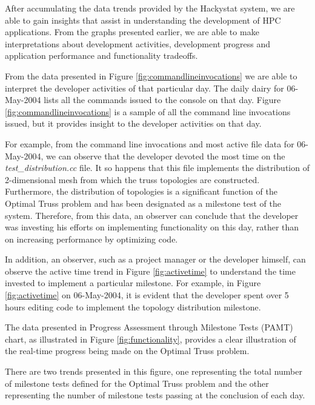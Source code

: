 \documentclass[10pt,twocolumn]{article}
\begin{document}
\label{sec:conclusions}

After accumulating the data trends provided by the Hackystat system,
we are able to gain insights that assist in understanding the
development of HPC applications.  From the graphs presented earlier,
we are able to make interpretations about development activities,
development progress and application performance and functionality
tradeoffs.

\label{sec:devactivities}

From the data presented in Figure \ref{fig:commandlineinvocations} we
are able to interpret the developer activities of that particular day.
The daily dairy for 06-May-2004 lists all the commands issued to the
console on that day.  Figure \ref{fig:commandlineinvocations} is a
sample of all the command line invocations issued, but it provides
insight to the developer activities on that day.

For example, from the command line invocations and most active file
data for 06-May-2004, we can observe that the developer devoted the
most time on the {\it test\_distribution.cc} file.  It so happens that this
file implements the distribution of 2-dimensional mesh from which the
truss topologies are constructed.  Furthermore, the distribution of
topologies is a significant function of the Optimal Truss problem and
has been designated as a milestone test of the system.  Therefore,
from this data, an observer can conclude that the developer was
investing his efforts on implementing functionality on this day,
rather than on increasing performance by optimizing code.

In addition, an observer, such as a project manager or the developer
himself, can observe the active time trend in Figure
\ref{fig:activetime} to understand the time invested to implement a
particular milestone.  For example, in Figure \ref{fig:activetime} on
06-May-2004, it is evident that the developer spent over 5 hours
editing code to implement the topology distribution milestone.

\label{sec:devprogress}

The data presented in Progress Assessment through Milestone Tests (PAMT)
chart, as illustrated in Figure \ref{fig:functionality}, provides a clear illustration
of the real-time progress being made on the Optimal Truss problem.

There are two trends presented in this figure, one representing the
total number of milestone tests defined for the Optimal Truss problem
and the other representing the number of milestone tests passing at
the conclusion of each day.  
\end{document}
